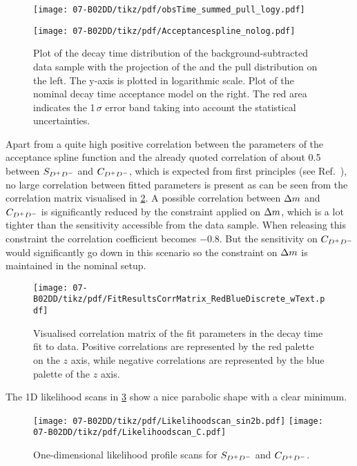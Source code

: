 \begin{figure}[htb]
\hspace*{\fill}
\begin{minipage}{0.4\textwidth}
\texttt{[image: 07-B02DD/tikz/pdf/obsTime\_summed\_pull\_logy.pdf]}
\end{minipage}
\hfill
\begin{minipage}{0.5\textwidth}
\texttt{[image: 07-B02DD/tikz/pdf/Acceptancespline\_nolog.pdf]}
\end{minipage}
\hspace*{\fill}
\caption{Plot of the decay time distribution of the background-subtracted \BdToDD
data sample with the projection of the \PDF and the pull distribution on the
left. The y-axis is plotted in logarithmic scale. Plot of the nominal decay
time acceptance model on the right. The red area indicates the 1\,$\sigma$
error band taking into account the statistical uncertainties.}
\label{fig:b02dd:decaytimefit}
\end{figure}

Apart from a quite high positive correlation between the parameters of the
acceptance spline function and the already quoted correlation of about
\num{0.5} between $S_{{{D}^+}{{D}^-}}$ and $C_{{{D}^+}{{D}^-}}$, which is expected from first principles
(see Ref.~\cite{LHCb-ANA-2011-004}), no large correlation between fitted parameters
is present as can be seen from the correlation matrix visualised in
\cref{fig:b02dd:decaytimefit:FullFitCorrMatrixHotCold}. A possible correlation
between ${\Delta m}$ and $C_{{{D}^+}{{D}^-}}$ is significantly reduced by the constraint applied on ${\Delta m}$,
which is a lot tighter than the sensitivity accessible from the data sample.
When releasing this constraint the correlation coefficient becomes \num{-0.8}.
But the sensitivity on $C_{{{D}^+}{{D}^-}}$ would significantly go down in this scenario so
the constraint on ${\Delta m}$ is maintained in the nominal setup.

\begin{figure}[htb]
\centering
\texttt{[image: 07-B02DD/tikz/pdf/FitResultsCorrMatrix\_RedBlueDiscrete\_wText.pdf]}
\caption{Visualised correlation matrix of the fit parameters in the decay time
fit to data. Positive correlations are represented by the red palette on the $z$ axis,
while negative correlations are represented by the blue palette of the $z$
axis.}
\label{fig:b02dd:decaytimefit:FullFitCorrMatrixHotCold}
\end{figure}

The 1D likelihood scans in \cref{fig:b02dd:decaytimefit:1DLLScan} show a nice
parabolic shape with a clear minimum.
\begin{figure}[htb]
\centering
\texttt{[image: 07-B02DD/tikz/pdf/Likelihoodscan\_sin2b.pdf]}
\texttt{[image: 07-B02DD/tikz/pdf/Likelihoodscan\_C.pdf]}
\caption{One-dimensional likelihood profile scans for $S_{{{D}^+}{{D}^-}}$ and $C_{{{D}^+}{{D}^-}}$.}
\label{fig:b02dd:decaytimefit:1DLLScan}
\end{figure}

